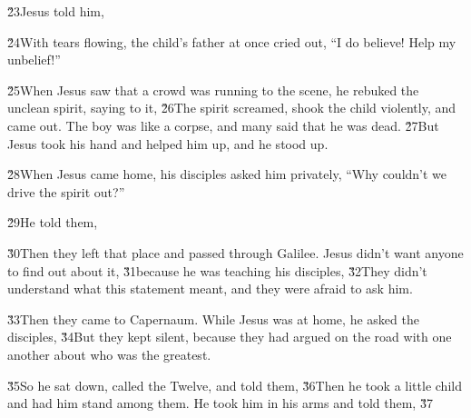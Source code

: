 \v{23}Jesus told him, 

\v{24}With tears flowing, the child's father at once cried out, ``I do believe! Help my unbelief!''

\v{25}When Jesus saw that a crowd was running to the scene, he rebuked the unclean spirit, saying to it,  \v{26}The spirit screamed, shook the child violently, and came out. The boy was like a corpse, and many said that he was dead. \v{27}But Jesus took his hand and helped him up, and he stood up.

\v{28}When Jesus came home, his disciples asked him privately, ``Why couldn't we drive the spirit out?''

\v{29}He told them, 

\v{30}Then they left that place and passed through Galilee. Jesus didn't want anyone to find out about it, \v{31}because he was teaching his disciples,  \v{32}They didn't understand what this statement meant, and they were afraid to ask him.

\v{33}Then they came to Capernaum. While Jesus was at home, he asked the disciples,  \v{34}But they kept silent, because they had argued on the road with one another about who was the greatest.

\v{35}So he sat down, called the Twelve, and told them,  \v{36}Then he took a little child and had him stand among them. He took him in his arms and told them, \v{37}


